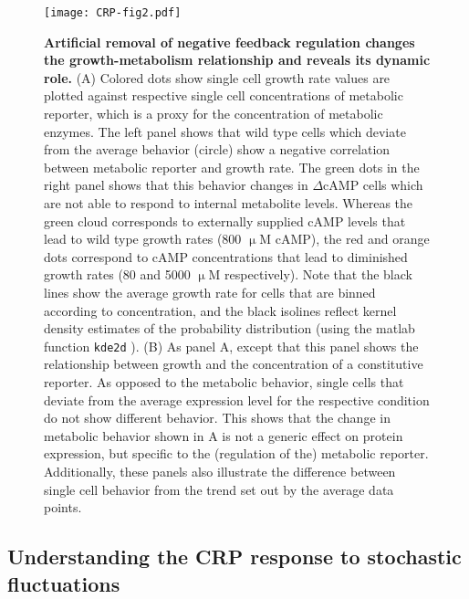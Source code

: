 \begin{figure}
	\centering
	\texttt{[image: CRP-fig2.pdf]}
	\caption{ 
		\textbf{Artificial removal of negative feedback regulation changes the growth-metabolism relationship and reveals its dynamic role.}		
		(A) Colored dots show single cell growth rate values are plotted against respective single cell concentrations of metabolic reporter, which is a proxy for the concentration of metabolic enzymes. 
		The left panel shows that wild type cells which deviate from the average behavior (circle) show a negative correlation between metabolic reporter and growth rate.
		The green dots in the right panel shows that this behavior changes in $\Delta$cAMP cells which are not able to respond to internal metabolite levels. 
		Whereas the green cloud corresponds to externally supplied cAMP levels that lead to wild type growth rates (800 $\upmu$M cAMP), the 
		red and orange dots correspond to cAMP concentrations that lead to diminished growth rates (80 and 5000 $\upmu$M respectively).		
		Note that the black lines show the average growth rate for cells that are binned according to concentration, and the black isolines reflect kernel density estimates of the probability distribution (using the matlab function \texttt{kde2d} \cite{Botev2010}).
		(B) As panel A, except that this panel shows the relationship between growth and the concentration of a constitutive reporter. 
		As opposed to the metabolic behavior, single cells that deviate from the average expression level for the respective condition do not show  different behavior.
		This shows that the change in metabolic behavior shown in A is not a generic effect on protein expression, but specific to the (regulation of the) metabolic reporter.
		Additionally, these panels also illustrate the difference between single cell behavior from the trend set out by the average data points.
	}
	\label{fig:CRP:fig2}
\end{figure}


\subsection*{Understanding the CRP response to stochastic fluctuations}

